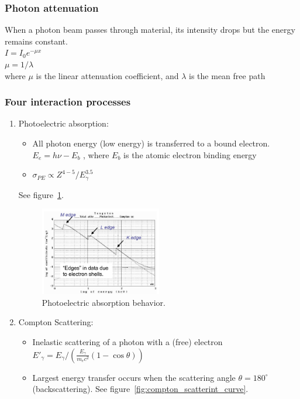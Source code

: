 \subsubsection{Photon attenuation}
When a photon beam passes through material, its intensity drops but the energy remains constant.\\
$I=I_0e^{-\mu x}$\\
$\mu=1/\lambda$\\
where $\mu$ is the linear attenuation coefficient, and $\lambda$ is the mean free path
\subsubsection{Four interaction processes}
\begin{enumerate}
    \item Photoelectric absorption:
    \begin{itemize}
        \item All photon energy (low energy) is transferred to a bound electron.\\
        $E_e=h\nu-E_b$ , where $E_b$ is the atomic electron binding energy
        \item $\sigma_{PE}\propto Z^{4-5}/E_\gamma^{3.5}$
    \end{itemize}
    See figure~\ref{fig:photoelectric_absorption_edges}.
    \begin{figure}[ht]
        \centering
        \includegraphics[width=0.5\textwidth]{images/photoelectric_absorption_edges.png}
        \caption{Photoelectric absorption behavior.}
        \label{fig:photoelectric_absorption_edges}
    \end{figure}
    \item Compton Scattering:
    \begin{itemize}
        \item Inelastic scattering of a photon with a (free) electron\\
        $E'_\gamma=E_\gamma/\left(\frac{E_\gamma}{m_ec^2}(1-\cos\theta)\right)$
        \item Largest energy transfer occurs when the scattering angle $\theta=180^\circ$ (backscattering). See figure~\ref{fig:compton_scatterint_curve}.

\end{itemize}
\end{enumerate}
